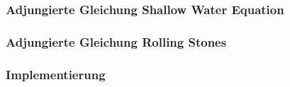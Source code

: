 \begin{frame}
\frametitle{Adjungierte Gleichung Shallow Water Equation}
\begin{minipage}[c]{0.45\textwidth}
\centering
\scalebox{0.9}{}
\scalebox{0.9}{}
\end{minipage}
\begin{minipage}[c]{0.45\textwidth}
\centering
\scalebox{0.9}{}
\scalebox{0.9}{}
\end{minipage}
\end{frame}





\begin{frame}
\frametitle{Adjungierte Gleichung Rolling Stones}
\begin{minipage}[c]{0.45\textwidth}
\centering
\scalebox{1.1}{}
\end{minipage}
\begin{minipage}[c]{0.45\textwidth}
\centering
\scalebox{1.1}{}
\end{minipage}
\end{frame}




\begin{frame}[fragile]
\frametitle{Implementierung}
\cite{openblas}
\cite{armadillo}
\cite{ADOLCmanual}
\cite{boeck14}
\end{frame}

\setcounter{framenumber}{\value{finalframe}}
